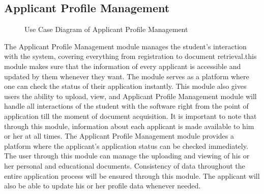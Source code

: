 





% 
% 
% 

% 
% 

% 


\clearpage
\subsection{Applicant Profile Management}

\begin{figure}[htbp]
\centering

\caption{Use Case Diagram of Applicant Profile Management}
\label{fig:applicant_management_usecase}
\end{figure}

The Applicant Profile Management module manages the student's interaction with the system, covering everything from registration to document retrieval.this module makes sure that the information of every applicant is accessible and updated by them whenever they want. The module serves as a platform where one can check the status of their application instantly. This module also gives users the ability to upload, view, and Applicant Profile Management module will handle all interactions of the student with the software right from the point of application till the moment of document acquisition. It is important to note that through this module, information about each applicant is made available to him or her at all times. The Applicant Profile Management module provides a platform where the applicant's application status can be checked immediately. The user through this module can manage the uploading and viewing of his or her personal and educational documents. Consistency of data throughout the entire application process will be ensured through this module. The applicant will also be able to update his or her profile data whenever needed.
\clearpage






% 
% 
% 


